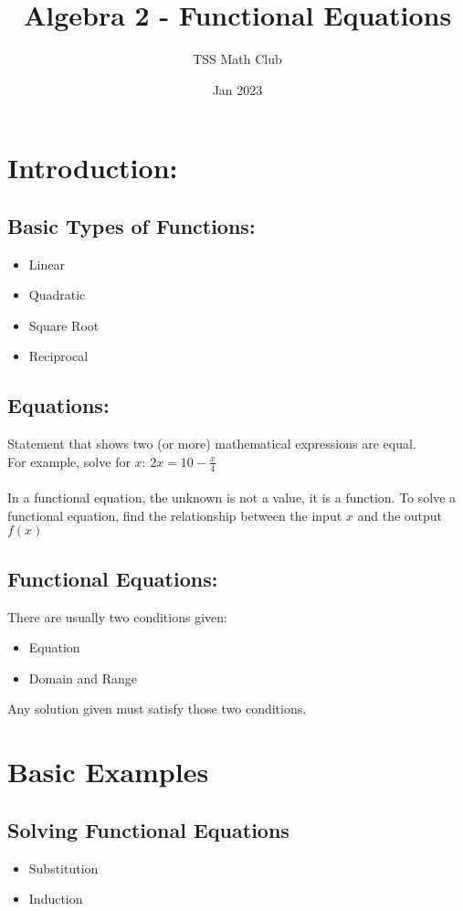 \documentclass{article}
\title{Algebra 2 - Functional Equations}
\author{TSS Math Club}
\date{Jan 2023}
\begin{document}
\large

\maketitle

\section{Introduction:}

\subsection{Basic Types of Functions:}
\begin{itemize}
    \item Linear
    \item Quadratic
    \item Square Root
    \item Reciprocal
\end{itemize}

\subsection{Equations:}
Statement that shows two (or more) mathematical expressions are equal.
\\For example, solve for $x$: $2x = 10 - \frac{x}{4}$
\\~\\ In a functional equation, the unknown is not a value, it is a function.
To solve a functional equation, find the relationship between the input $x$ and the output $f(x)$
\subsection{Functional Equations:}
There are usually two conditions given:
\begin{itemize}
    \item Equation
    \item Domain and Range
\end{itemize}
Any solution given must satisfy those two conditions.
\vspace{40px}

\section{Basic Examples}
\subsection{Solving Functional Equations}
\begin{itemize}
    \item Substitution
    \item Induction
\end{itemize}
\end{document}

